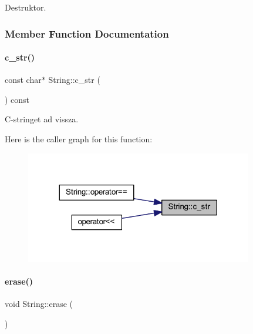 Destruktor. 



\subsubsection{Member Function Documentation}
\mbox{\label{class_string_a0274f3e61533d15086816fb7f47ccb54}} 
\paragraph{\texorpdfstring{c\_str()}{c\_str()}}
{\footnotesize\ttfamily const char$\ast$ String\+::c\+\_\+str (\begin{DoxyParamCaption}{ }\end{DoxyParamCaption}) const\hspace{0.3cm}{\ttfamily [inline]}}



C-\/stringet ad vissza. 

Here is the caller graph for this function\+:
\nopagebreak
\begin{figure}[H]
\begin{center}
\leavevmode
\includegraphics[width=281pt]{class_string_a0274f3e61533d15086816fb7f47ccb54_icgraph}
\end{center}
\end{figure}
\mbox{\label{class_string_a3ce2ea55be9ec912bb2dbc88d461b479}} 
\paragraph{\texorpdfstring{erase()}{erase()}}
{\footnotesize\ttfamily void String\+::erase (\begin{DoxyParamCaption}{ }\end{DoxyParamCaption})\hspace{0.3cm}{\ttfamily [inline]}}



